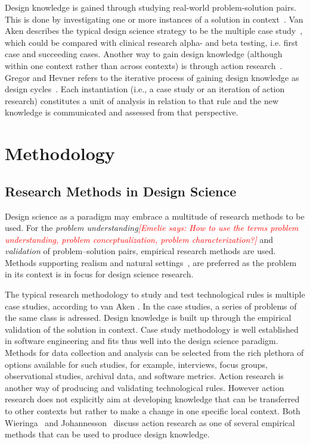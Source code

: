 \documentclass[graybox]{svmult}
\newcommand{\emelie}[1]{\textcolor{red}{{\it [Emelie says: #1]}}}
\newcommand{\emelie}[1]{}
\begin{document}
Design knowledge is gained through studying real-world problem-solution pairs. This is done by investigating one or more instances of a solution in context~\cite{wieringa_what_2014}. Van Aken describes the typical design science strategy to be the multiple case study~\cite{van_aken_management_2004}, which could be compared with clinical research alpha- and beta testing, i.e. first case and succeeding cases.
Another way to gain design knowledge (although within one context rather than across contexts) is through action research~\cite{wieringa_technical_2012}. Gregor and Hevner refers to the iterative process of gaining design knowledge as design cycles~\cite{gregor_positioning_2013}. Each instantiation (i.e., a case study or an iteration of action research) constitutes a unit of analysis in relation to that rule and the new knowledge is communicated and assessed from that perspective. 



\section{Methodology}

\subsection{Research Methods in Design Science} 

Design science as a paradigm may embrace a multitude of research methods to be used. For the \emph{problem understanding}\emelie{How to use the terms problem understanding, problem conceptualization, problem characterization?} and \emph{validation} of problem--solution pairs, empirical research methods are used. Methods supporting realism and natural settings~\cite{StolABC18}, are preferred as the problem in its context is in focus for design science research. 

The typical research methodology to study and test technological rules is multiple case studies, according to van Aken \cite{van_aken_management_2004}. In the case studies, a series of problems of the same class is adressed. Design knowledge is built up through the empirical validation of the solution in context. Case study methodology is well established in software engineering \cite{Runeson12Case} and fits thus well into the design science paradigm. Methods for data collection and analysis can be selected from the rich plethora of options available for such studies, for example, interviews, focus groups, observational studies, archival data, and software metrics. Action research is another way of producing and validating technological rules. However action research does not explicitly aim at developing knowledge that can be transferred to other contexts but rather to make a change in one specific local context. Both Wieringa~\cite{wieringa_technical_2012} and Johannesson~\cite{johannesson_introduction_2014} discuss action research as one of several empirical methods that can be used to produce design knowledge.
\end{document}
